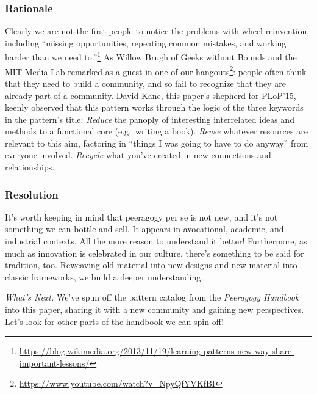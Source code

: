 \subsubsection*{Rationale} 
Clearly we are not the first people to notice the problems with wheel-reinvention, including ``missing opportunities, repeating common mistakes, and working harder than we need to.''\footnote{\url{https://blog.wikimedia.org/2013/11/19/learning-patterns-new-way-share-important-lessons/}}  As Willow Brugh of Geeks without Bounds and the MIT Media Lab remarked as a guest in one of our hangouts\footnote{\url{https://www.youtube.com/watch?v=NpyQfYVKfBI}}: people often think that they need to build a community, and so fail to recognize that they are already part of a community.   David Kane, this paper's shepherd for PLoP'15, keenly observed that this pattern works through the logic of the three keywords in the pattern's title:  \emph{Reduce} the panoply of interesting interrelated ideas and methods to a functional core (e.g.~writing a book).  \emph{Reuse} whatever resources are relevant to this aim, factoring in ``things I was going to have to do anyway'' from everyone involved.  \emph{Recycle} what you've created in new connections and relationships.  

\subsubsection*{Resolution}  It's worth keeping in mind that peeragogy per se is not new, and it's not something we can bottle and sell. It appears in avocational, academic, and industrial contexts. All the more reason to understand it better!  Furthermore, as much as innovation is celebrated in our culture, there's something to be said for tradition, too.  Reweaving old material into new designs and new material into classic frameworks, we build a deeper understanding.

\begin{framed}
\emph{What's Next.}
We've spun off the pattern catalog from the \emph{Peeragogy Handbook} into this paper, sharing it with a new community and gaining new perspectives.  Let's look for other parts of the handbook we can spin off!
\end{framed}



    
    
